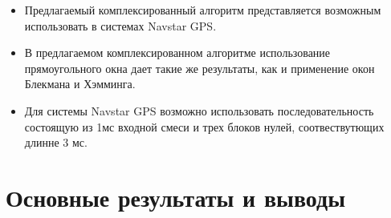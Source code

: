 \begin{itemize}
\item Предлагаемый комплексированный алгоритм представляется возможным использовать в системах Navstar GPS. 
\item В предлагаемом комплексированном алгоритме использование прямоугольного окна дает такие же результаты, как и применение окон Блекмана и Хэмминга.
\item Для системы Navstar GPS возможно использовать последовательность состоящую из 1мс входной смеси и трех блоков нулей, соотвествутющих длинне 3 мс.
\end{itemize}

\clearpage

\chapter*{Основные результаты и выводы}

